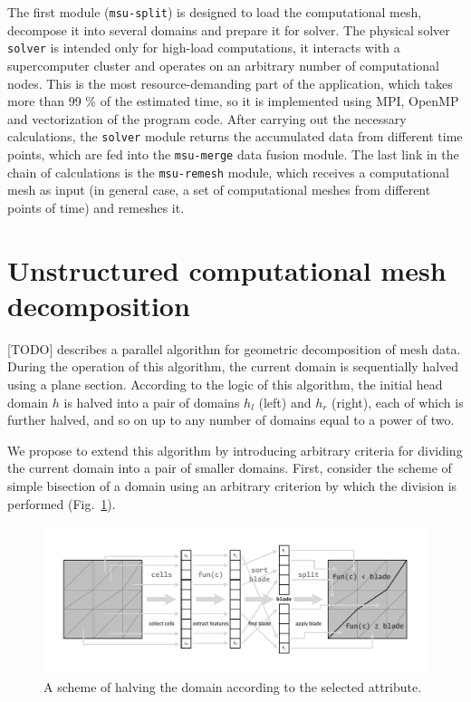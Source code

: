 \documentclass[
11pt,%
tightenlines,%
twoside,%
onecolumn,%
nofloats,%
nobibnotes,%
nofootinbib,%
superscriptaddress,%
noshowpacs,%
centertags]%
{revtex4}
\begin{document}
The first module (\texttt{msu-split}) is designed to load the computational mesh, decompose it into several domains and prepare it for solver.
The physical solver \texttt{solver} is intended only for high-load computations, it interacts with a supercomputer cluster and operates on an arbitrary number of computational nodes.
This is the most resource-demanding part of the application, which takes more than 99 \% of the estimated time, so it is implemented using MPI, OpenMP and vectorization of the program code.
After carrying out the necessary calculations, the \texttt{solver} module returns the accumulated data from different time points, which are fed into the \texttt{msu-merge} data fusion module.
The last link in the chain of calculations is the \texttt{msu-remesh} module, which receives a computational mesh as input (in general case, a set of computational meshes from different points of time) and remeshes it.

\section{Unstructured computational mesh decomposition}

[TODO] describes a parallel algorithm for geometric decomposition of mesh data.
During the operation of this algorithm, the current domain is sequentially halved using a plane section.
According to the logic of this algorithm, the initial head domain $h$ is halved into a pair of domains $h_l$ (left) and $h_r$ (right), each of which is further halved, and so on up to any number of domains equal to a power of two.

We propose to extend this algorithm by introducing arbitrary criteria for dividing the current domain into a pair of smaller domains.
First, consider the scheme of simple bisection of a domain using an arbitrary criterion by which the division is performed (Fig.~\ref{fig:03-split}).

\begin{figure}[h]
\includegraphics[width=1.0\textwidth]{pics/03-split.pdf}
\caption{A scheme of halving the domain according to the selected attribute.}\label{fig:03-split}
\end{figure}
\end{document}
